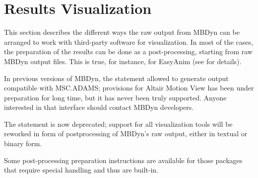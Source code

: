 %
%
%
%
%
% 
%
%

\chapter{Results Visualization}
\label{sec:APP:OUTPUTRESULTS}
This section describes the different ways the raw output from MBDyn
can be arranged to work with third-party software for visualization.
In most of the cases, the preparation of the results can be done 
as a post-processing, starting from raw MBDyn output files.
This is true, for instance, for EasyAnim (see
for details).

In previous versions of MBDyn, the  statement
allowed to generate output compatible with MSC.ADAMS; provisions 
for Altair Motion View has been under preparation for long time,
but it has never been truly supported.
Anyone interested in that interface should contact MBDyn developers.

\noindent
The  statement is now deprecated;
support for all visualization tools will be reworked
in form of postprocessing of MBDyn's raw output, either in textual
or binary form. %

\noindent
Some post-processing preparation instructions are available
for those packages that require special handling and thus
are built-in.

